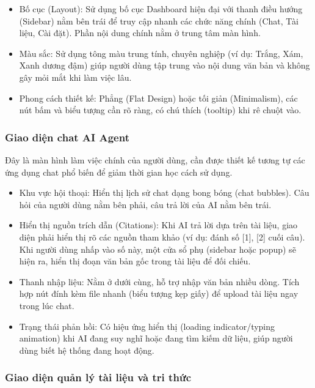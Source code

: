 \begin{itemize}
\item
  Bố cục (Layout): Sử dụng bố cục Dashboard hiện đại với thanh điều
  hướng (Sidebar) nằm bên trái để truy cập nhanh các chức năng chính
  (Chat, Tài liệu, Cài đặt). Phần nội dung chính nằm ở trung tâm màn
  hình.
\item
  Màu sắc: Sử dụng tông màu trung tính, chuyên nghiệp (ví dụ: Trắng,
  Xám, Xanh dương đậm) giúp người dùng tập trung vào nội dung văn bản và
  không gây mỏi mắt khi làm việc lâu.
\item
  Phong cách thiết kế: Phẳng (Flat Design) hoặc tối giản (Minimalism),
  các nút bấm và biểu tượng cần rõ ràng, có chú thích (tooltip) khi rê
  chuột vào.
\end{itemize}

\subsubsection{Giao diện chat AI Agent}\label{giao-diux1ec7n-chat-ai-agent}

Đây là màn hình làm việc chính của người dùng, cần được thiết kế tương
tự các ứng dụng chat phổ biến để giảm thời gian học cách sử dụng.

\begin{itemize}
\item
  Khu vực hội thoại: Hiển thị lịch sử chat dạng bong bóng (chat
  bubbles). Câu hỏi của người dùng nằm bên phải, câu trả lời của AI nằm
  bên trái.
\item
  Hiển thị nguồn trích dẫn (Citations): Khi AI trả lời dựa trên tài
  liệu, giao diện phải hiển thị rõ các nguồn tham khảo (ví dụ: đánh số
  {[}1{]}, {[}2{]} cuối câu). Khi người dùng nhấp vào số này, một cửa sổ
  phụ (sidebar hoặc popup) sẽ hiện ra, hiển thị đoạn văn bản gốc trong
  tài liệu để đối chiếu.
\item
  Thanh nhập liệu: Nằm ở dưới cùng, hỗ trợ nhập văn bản nhiều dòng. Tích
  hợp nút đính kèm file nhanh (biểu tượng kẹp giấy) để upload tài liệu
  ngay trong lúc chat.
\item
  Trạng thái phản hồi: Có hiệu ứng hiển thị (loading indicator/typing
  animation) khi AI đang suy nghĩ hoặc đang tìm kiếm dữ liệu, giúp người
  dùng biết hệ thống đang hoạt động.
\end{itemize}

\subsubsection{Giao diện quản lý tài liệu và tri
thức}\label{giao-diux1ec7n-quux1ea3n-luxfd-tuxe0i-liux1ec7u-vuxe0-tri-thux1ee9c}

